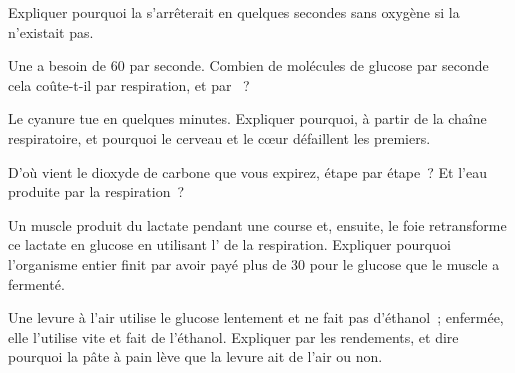 \begin{exercise}[$\star\star$]\label{exo:g12:respiration-fermentation:8}
Expliquer pourquoi la  s'arrêterait en quelques secondes sans
oxygène si la  n'existait pas.
\end{exercise}

\begin{exercise}[$\star\star$]\label{exo:g12:respiration-fermentation:9}
Une  a besoin de 60  par seconde. Combien de molécules de
glucose par seconde cela coûte-t-il par respiration, et par
~?
\end{exercise}

\begin{exercise}[$\star\star$]\label{exo:g12:respiration-fermentation:10}
Le cyanure tue en quelques minutes. Expliquer pourquoi, à partir de la
chaîne respiratoire, et pourquoi le cerveau et le cœur défaillent les
premiers.
\end{exercise}

\begin{exercise}[$\star\star$]\label{exo:g12:respiration-fermentation:11}
D'où vient le dioxyde de carbone que vous expirez, étape par étape~?
Et l'eau produite par la respiration~?
\end{exercise}

\begin{exercise}[$\star\star\star$]\label{exo:g12:respiration-fermentation:12}
Un muscle produit du lactate pendant une course et, ensuite, le foie
retransforme ce lactate en glucose en utilisant l' de la
respiration. Expliquer pourquoi l'organisme entier finit par avoir
payé plus de 30  pour le glucose que le muscle a fermenté.
\end{exercise}

\begin{exercise}[$\star\star\star$]\label{exo:g12:respiration-fermentation:13}
Une levure à l'air utilise le glucose lentement et ne fait pas
d'éthanol~; enfermée, elle l'utilise vite et fait de l'éthanol.
Expliquer par les rendements, et dire pourquoi la pâte à pain lève que
la levure ait de l'air ou non.
\end{exercise}

